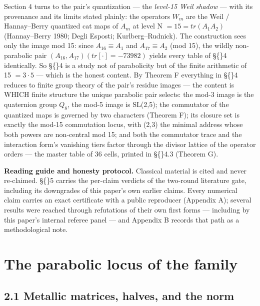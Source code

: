 \documentclass[11pt]{article}
\theoremstyle{plain}
\theoremstyle{definition}
\theoremstyle{remark}
\begin{document}
Section 4 turns to the pair's quantization — the \emph{level-15 Weil shadow} — with its provenance and its limits stated plainly: the operators \(W_{m}\) are the Weil \(/\) Hannay–Berry quantized cat maps of \(A_{m}\) at level N \(= 15 = tr(A_{1}A_{2})\) (Hannay–Berry 1980; Degli Esposti; Kurlberg–Rudnick). The construction sees only the image mod 15: since \(A_{16} \equiv  A_{1}\) and \(A_{17} \equiv  A_{2}\) (mod 15), the wildly non-parabolic pair \((A_{16}, A_{17}) (tr[\cdot ] = -73982)\) yields every table of \S\{\}4 identically. So \S\{\}4 is a study not of parabolicity but of the finite arithmetic of 15 \(= 3\cdot 5\) — which is the honest content. By Theorem F everything in \S\{\}4 reduces to finite group theory of the pair's residue images — the content is WHICH finite structure the unique parabolic pair selects: the mod-3 image is the quaternion group \(Q_{8}\), the mod-5 image is SL(2,5); the commutator of the quantized maps is governed by two characters (Theorem F); its closure set is exactly the mod-15 commutation locus, with (2,3) the minimal address whose both powers are non-central mod 15; and both the commutator trace and the interaction form's vanishing tiers factor through the divisor lattice of the operator orders — the master table of 36 cells, printed in \S\{\}4.3 (Theorem G).

\textbf{Reading guide and honesty protocol.} Classical material is cited and never re-claimed. \S\{\}5 carries the per-claim verdicts of the two-round literature gate, including its downgrades of this paper's own earlier claims. Every numerical claim carries an exact certificate with a public reproducer (Appendix A); several results were reached through refutations of their own first forms — including by this paper's internal referee panel — and Appendix B records that path as a methodological note.

\section{The parabolic locus of the family}

\subsection{2.1 Metallic matrices, halves, and the norm}
\end{document}
